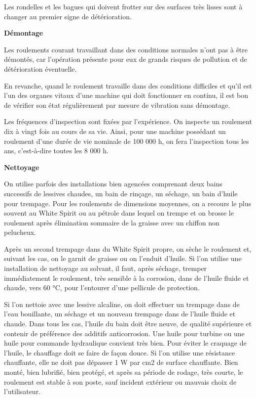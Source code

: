 Les rondelles et les bagues qui doivent frotter sur des surfaces très lisses sont à changer au premier signe de détérioration.

\vspace{0.3cm}
\textbf{	Démontage }
\vspace{0.3cm}

Les roulements courant travaillant dans des conditions normales n’ont pas à être démontés, car l’opération présente pour eux de grands risques de pollution et de détérioration éventuelle.
\vspace{0.3cm}

En revanche, quand le roulement travaille dans des conditions difficiles et qu’il est l’un des organes vitaux d’une machine qui doit fonctionner en continu, il est bon de vérifier son état régulièrement par mesure de vibration sans démontage.
\vspace{0.3cm}

Les fréquences d’inspection sont fixées par l’expérience. On inspecte un roulement dix à vingt fois au cours de sa vie. Ainsi, pour une machine possédant un roulement d’une durée de vie nominale de 100 000 h, on fera l’inspection tous les ans, c’est-à-dire toutes les 8 000 h.


\vspace{0.3cm}
\textbf{	Nettoyage}
\vspace{0.3cm}

On utilise parfois des installations bien agencées comprenant deux bains successifs de lessives chaudes, un bain de rinçage, un séchage, un bain d’huile pour trempage.
Pour les roulements de dimensions moyennes, on a recours le plus souvent au White Spirit ou au pétrole dans lequel on trempe et on brosse le roulement après élimination sommaire de la graisse avec un chiffon non pelucheux.
\vspace{0.3cm}

Après un second trempage dans du White Spirit propre, on sèche le roulement et, suivant les cas, on le garnit de graisse ou on l’enduit d’huile.
Si l’on utilise une installation de nettoyage au solvant, il faut, après séchage, tremper immédiatement le roulement, très sensible à la corrosion, dans de l’huile fluide et chaude, vers 60 °C, pour l’entourer d’une pellicule de protection.
\vspace{0.3cm}

Si l’on nettoie avec une lessive alcaline, on doit effectuer un trempage dans de l’eau bouillante, un séchage et un nouveau trempage dans de l’huile fluide et chaude. Dans tous les cas, l’huile du bain doit être neuve, de qualité supérieure et contenir de préférence des additifs anticorrosion.
Une huile pour turbine ou une huile pour commande hydraulique convient très bien. Pour éviter le craquage de l’huile, le chauffage doit se faire de façon douce. Si l’on utilise une résistance chauffante, elle ne doit pas dépasser 1 W par cm2 de surface chauffante.
Bien monté, bien lubrifié, bien protégé, et après sa période de rodage, très courte, le roulement est stable à son poste, sauf incident extérieur ou mauvais choix de l’utilisateur.


